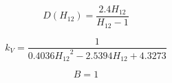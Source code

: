 {\newpage\clearpage
{}%
\begin{displaymath}
D(H_{12}) = \frac{2.4 H_{12}}{H_{12} - 1}
\end{displaymath}%
\lthtmldisplayZ
\lthtmlcheckvsize\clearpage}

{\newpage\clearpage
{}%
\begin{displaymath}
k_V = \frac{1}{0.4036 {H_{12}}^2 - 2.5394 H_{12} + 4.3273}
\end{displaymath}%
\lthtmldisplayZ
\lthtmlcheckvsize\clearpage}

{\newpage\clearpage
{}%
\begin{displaymath}
B=1
\end{displaymath}%
\lthtmldisplayZ
\lthtmlcheckvsize\clearpage}



